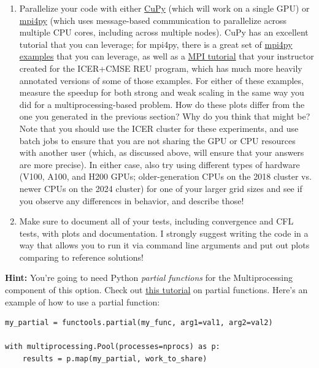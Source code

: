 \documentclass[10pt]{article}
\begin{document}
\begin{enumerate}
\item Parallelize your code with either \href{https://cupy.dev/}{CuPy}
  (which will work on a single GPU) or
  \href{https://mpi4py.readthedocs.io/en/stable/index.html}{mpi4py}
  (which uses message-based communication to parallelize across
  multiple CPU cores, including across multiple nodes).  CuPy has an
  excellent tutorial that you can leverage; for mpi4py, there is a
  great set of
  \href{https://github.com/jbornschein/mpi4py-examples}{mpi4py
    examples}  that you can leverage, as well as a
  \href{https://github.com/bwoshea/ACRES_MPI_tutorial}{MPI tutorial} that your
  instructor created for the ICER+CMSE REU program, which has much
  more heavily annotated versions of some of those examples.  For
  either of these examples, measure the speedup for both strong and
  weak scaling in the same way you did for a multiprocessing-based
  problem.  How do these plots differ from the one you generated in
  the previous section?  Why do you think that might be?  Note that
  you should use the ICER cluster for these experiments, and use batch
  jobs to ensure that you are not sharing the GPU or CPU resources
  with another user (which, as discussed above, will ensure that your
  answers are more precise).  In either case, also try using different
  types of hardware (V100, A100, and H200 GPUs; older-generation CPUs
  on the 2018 cluster vs. newer CPUs on the 2024 cluster) for one of
  your larger grid sizes and see if you observe any differences in
  behavior, and describe those!

  \item Make sure to document all of your tests, including convergence
  and CFL tests, with plots and documentation.  I strongly suggest
  writing the code in a way that allows you to run it via command line
  arguments and put out plots comparing to reference solutions!


\end{enumerate}

\noindent
\textbf{Hint:} You're going to need Python \textit{partial functions}
for the Multiprocessing component of this option.  Check out
\href{https://www.pythontutorial.net/python-basics/python-partial-functions/}{this
  tutorial}
on partial functions.  Here's an example of how to use a partial
function:

\begin{verbatim}
my_partial = functools.partial(my_func, arg1=val1, arg2=val2)

with multiprocessing.Pool(processes=nprocs) as p:
    results = p.map(my_partial, work_to_share)
\end{verbatim}
\end{document}

